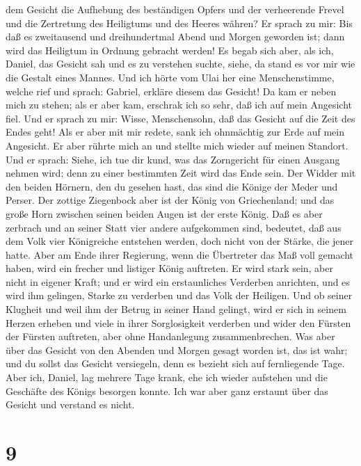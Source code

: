 dem Gesicht die Aufhebung des beständigen Opfers und der verheerende
Frevel und die Zertretung des Heiligtums und des Heeres währen?
 Er sprach zu mir: Bis daß es zweitausend und
dreihundertmal Abend und Morgen geworden ist; dann wird das Heiligtum in
Ordnung gebracht werden!  Es begab sich aber, als ich,
Daniel, das Gesicht sah und es zu verstehen suchte, siehe, da stand es
vor mir wie die Gestalt eines Mannes.  Und ich hörte vom
Ulai her eine Menschenstimme, welche rief und sprach: Gabriel, erkläre
diesem das Gesicht!  Da kam er neben mich zu stehen; als
er aber kam, erschrak ich so sehr, daß ich auf mein Angesicht fiel. Und
er sprach zu mir: Wisse, Menschensohn, daß das Gesicht auf die Zeit des
Endes geht!  Als er aber mit mir redete, sank ich
ohnmächtig zur Erde auf mein Angesicht. Er aber rührte mich an und
stellte mich wieder auf meinen Standort.  Und er sprach:
Siehe, ich tue dir kund, was das Zorngericht für einen Ausgang nehmen
wird; denn zu einer bestimmten Zeit wird das Ende sein. 
Der Widder mit den beiden Hörnern, den du gesehen hast, das sind die
Könige der Meder und Perser.  Der zottige Ziegenbock aber
ist der König von Griechenland; und das große Horn zwischen seinen
beiden Augen ist der erste König.  Daß es aber zerbrach
und an seiner Statt vier andere aufgekommen sind, bedeutet, daß aus dem
Volk vier Königreiche entstehen werden, doch nicht von der Stärke, die
jener hatte.  Aber am Ende ihrer Regierung, wenn die
Übertreter das Maß voll gemacht haben, wird ein frecher und listiger
König auftreten.  Er wird stark sein, aber nicht in
eigener Kraft; und er wird ein erstaunliches Verderben anrichten, und es
wird ihm gelingen, Starke zu verderben und das Volk der Heiligen.
 Und ob seiner Klugheit und weil ihm der Betrug in seiner
Hand gelingt, wird er sich in seinem Herzen erheben und viele in ihrer
Sorglosigkeit verderben und wider den Fürsten der Fürsten auftreten,
aber ohne Handanlegung zusammenbrechen.  Was aber über
das Gesicht von den Abenden und Morgen gesagt worden ist, das ist wahr;
und du sollst das Gesicht versiegeln, denn es bezieht sich auf
fernliegende Tage.  Aber ich, Daniel, lag mehrere Tage
krank, ehe ich wieder aufstehen und die Geschäfte des Königs besorgen
konnte. Ich war aber ganz erstaunt über das Gesicht und verstand es
nicht.

\hypertarget{section-8}{%
\section{9}\label{section-8}}


